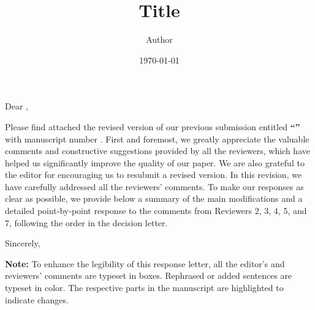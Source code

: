 \documentclass[12pt,american]{article}
\title{Title}
\author{Author}
\date{\today}
\begin{document}
\maketitle

\thispagestyle{empty}
\noindent Dear \editorname,

\medskip

Please find attached the revised version of our previous submission entitled \textbf{\enquote{\thetitle}} with manuscript number \textbf{\manuscript}. First and foremost, we greatly appreciate the valuable comments and constructive suggestions provided by all the reviewers, which have helped us significantly improve the quality of our paper. We are also grateful to the editor for encouraging us to resubmit a revised version. In this revision, we have carefully addressed all the reviewers' comments. To make our responses as clear as possible, we provide below a summary of the main modifications and a detailed point‑by‑point response to the comments from Reviewers 2, 3, 4, 5, and 7, following the order in the decision letter.

\vspace{6em}

\noindent Sincerely,

\medskip

\noindent\theauthor

\medskip

\noindent\thedate

\vfill

\textbf{Note:} To enhance the legibility of this response letter, all the editor's and reviewers' comments are typeset in boxes. Rephrased or added sentences are typeset in color. The respective parts in the manuscript are highlighted to indicate changes.
\clearpage

\tableofcontents

\clearpage

\setcounter{page}{1}

\pagestyle{fancy}
\fancyfoot[R]{\thepage}
\fancyfoot[C]{}



\printbibliography[heading=subbibliography, title={}]

\printbibliography[heading=subbibliography, title={}]


\end{document}
